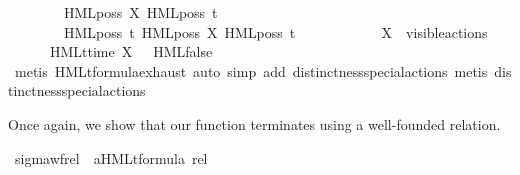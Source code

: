 \begin{isabellebody}
\ \ \ \ \ \ \ \ HML{\isacharunderscore}{\kern0pt}poss\ {\isasymepsilon}{\isacharbrackleft}{\kern0pt}X{\isacharbrackright}{\kern0pt}\ {\isacharparenleft}{\kern0pt}HML{\isacharunderscore}{\kern0pt}poss\ t\ {\isasymsigma}{\isacharparenleft}{\kern0pt}{\isasymphi}{\isacharparenright}{\kern0pt}{\isacharparenright}{\kern0pt}{\isacharcomma}{\kern0pt}\isanewline
\ \ \ \ \ \ \ \ HML{\isacharunderscore}{\kern0pt}poss\ t{\isacharunderscore}{\kern0pt}{\isasymepsilon}\ {\isacharparenleft}{\kern0pt}HML{\isacharunderscore}{\kern0pt}poss\ {\isasymepsilon}{\isacharbrackleft}{\kern0pt}X{\isacharbrackright}{\kern0pt}\ {\isacharparenleft}{\kern0pt}HML{\isacharunderscore}{\kern0pt}poss\ t\ {\isasymsigma}{\isacharparenleft}{\kern0pt}{\isasymphi}{\isacharparenright}{\kern0pt}{\isacharparenright}{\kern0pt}{\isacharparenright}{\kern0pt}\isanewline
\ \ \ \ \ \ {\isacharbraceright}{\kern0pt}{\isacharparenright}{\kern0pt}{\isacartoucheclose}\isanewline
\ \ {\isacharbar}{\kern0pt}\ {\isacartoucheopen}{\isasymnot}\ X\ {\isasymsubseteq}\ visible{\isacharunderscore}{\kern0pt}actions\ {\isasymLongrightarrow}\isanewline
\ \ \ \ \ \ {\isasymsigma}{\isacharparenleft}{\kern0pt}HMLt{\isacharunderscore}{\kern0pt}time\ X\ {\isasymphi}{\isacharparenright}{\kern0pt}\ {\isacharequal}{\kern0pt}\ HML{\isacharunderscore}{\kern0pt}false{\isacartoucheclose}\ \ \isanewline
%
\isadelimproof
\ \ %
\endisadelimproof
%
\isatagproof
{}\isamarkupfalse%
\ {\isacharparenleft}{\kern0pt}metis\ HMLt{\isacharunderscore}{\kern0pt}formula{\isachardot}{\kern0pt}exhaust{\isacharcomma}{\kern0pt}\ auto{\isacharplus}{\kern0pt}{\isacharcomma}{\kern0pt}\ {\isacharparenleft}{\kern0pt}simp\ add{\isacharcolon}{\kern0pt}\ distinctness{\isacharunderscore}{\kern0pt}special{\isacharunderscore}{\kern0pt}actions{\isacharparenleft}{\kern0pt}{}{\isacharcomma}{\kern0pt}{}{\isacharparenright}{\kern0pt}{\isacharparenright}{\kern0pt}{\isacharplus}{\kern0pt}{\isacharcomma}{\kern0pt}\ metis\ distinctness{\isacharunderscore}{\kern0pt}special{\isacharunderscore}{\kern0pt}actions{\isacharparenleft}{\kern0pt}{}{\isacharparenright}{\kern0pt}{\isacharparenright}{\kern0pt}%
\endisatagproof
{\isafoldproof}%
%
\isadelimproof
%
\endisadelimproof
%
\begin{isamarkuptext}%
Once again, we show that our function terminates using a well-founded relation.%
\end{isamarkuptext}\isamarkuptrue%
\isamarkupfalse%
\ sigma{\isacharunderscore}{\kern0pt}wf{\isacharunderscore}{\kern0pt}rel\ {\isacharcolon}{\kern0pt}{\isacharcolon}{\kern0pt}\ {\isacartoucheopen}{\isacharparenleft}{\kern0pt}{\isacharparenleft}{\kern0pt}{\isacharprime}{\kern0pt}a{\isacharparenright}{\kern0pt}HMLt{\isacharunderscore}{\kern0pt}formula{\isacharparenright}{\kern0pt}\ rel{\isacartoucheclose}\ \isanewline

\end{isabellebody}

